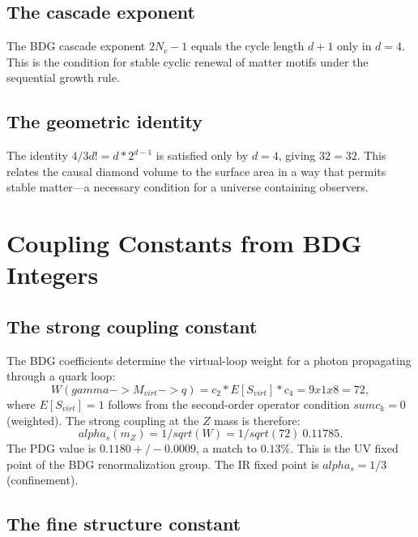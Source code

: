 \documentclass[11pt]{article}
\def\alpha{alpha}%
\def\gamma{gamma}%
\def\mathrm#1{#1}%
\def\mathbb#1{#1}%
\def\sqrt#1{sqrt(#1)}%
\def\frac#1#2{#1/#2}%
\def\cdot{*}%
\def\times{x}%
\def\approx{~}%
\def\to{->}%
\def\sum{sum}%
\def\pm{+/-}%
\begin{document}
\subsection{The cascade exponent}

The BDG cascade exponent $2N_c-1$ equals the cycle length $d+1$ only in $d=4$. This is the condition for stable cyclic renewal of matter motifs under the sequential growth rule.

\subsection{The geometric identity}

The identity $\frac{4}{3}d! = d\cdot 2^{d-1}$ is satisfied only by $d=4$, giving $32=32$. This relates the causal diamond volume to the surface area in a way that permits stable matter---a necessary condition for a universe containing observers.

\section{Coupling Constants from BDG Integers}
\label{sec:couplings}

\subsection{The strong coupling constant}

The BDG coefficients determine the virtual-loop weight for a photon propagating through a quark loop:
\begin{equation}
W(\gamma\to M_{\mathrm{virt}}\to q) = c_2 \cdot \mathbb{E}[S_{\mathrm{virt}}] \cdot c_4 = 9\times 1\times 8=72,
\end{equation}
where $\mathbb{E}[S_{\mathrm{virt}}]=1$ follows from the second-order operator condition $\sum c_k=0$ (weighted). The strong coupling at the $Z$ mass is therefore:
\begin{equation}
\alpha_s(m_Z) = \frac{1}{\sqrt{W}} = \frac{1}{\sqrt{72}} \approx 0.11785.
\end{equation}
The PDG value is $0.1180\pm 0.0009$, a match to $0.13\%$. This is the UV fixed point of the BDG renormalization group. The IR fixed point is $\alpha_s=1/3$ (confinement).

\subsection{The fine structure constant}
\end{document}
